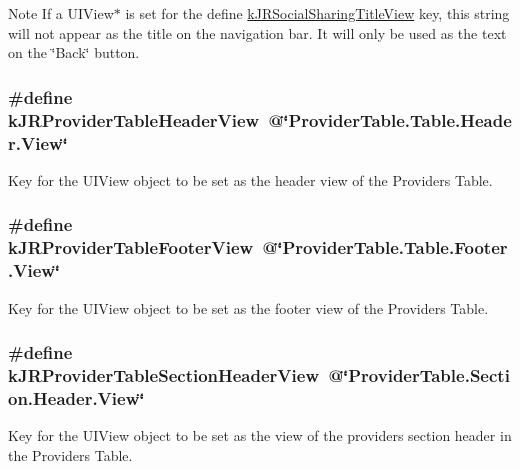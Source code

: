 \begin{DoxyNote}{Note}
If a {\ttfamily UIView$\ast$} is set for the define \hyperlink{group__custom_interface_ga524965cf426f0eb9de4bcb804528c7f7}{kJRSocialSharingTitleView} key, this string will not appear as the title on the navigation bar. It will only be used as the text on the \char`\"{}Back\char`\"{} button. 
\end{DoxyNote}
\hypertarget{group__custom_interface_ga1a0f39bfdb880fdd0b8b39cbec492b6f}{
\subsubsection[{kJRProviderTableHeaderView}]{\setlength{\rightskip}{0pt plus 5cm}\#define kJRProviderTableHeaderView~@\char`\"{}ProviderTable.Table.Header.View\char`\"{}}}
\label{group__custom_interface_ga1a0f39bfdb880fdd0b8b39cbec492b6f}
Key for the {\ttfamily UIView} object to be set as the header view of the Providers Table. \hypertarget{group__custom_interface_ga2b5c9162dd7701a552147ae1607a3b4d}{
\subsubsection[{kJRProviderTableFooterView}]{\setlength{\rightskip}{0pt plus 5cm}\#define kJRProviderTableFooterView~@\char`\"{}ProviderTable.Table.Footer.View\char`\"{}}}
\label{group__custom_interface_ga2b5c9162dd7701a552147ae1607a3b4d}
Key for the {\ttfamily UIView} object to be set as the footer view of the Providers Table. \hypertarget{group__custom_interface_gaaff8ebdd2b9badb1d0a019a71d47db46}{
\subsubsection[{kJRProviderTableSectionHeaderView}]{\setlength{\rightskip}{0pt plus 5cm}\#define kJRProviderTableSectionHeaderView~@\char`\"{}ProviderTable.Section.Header.View\char`\"{}}}
\label{group__custom_interface_gaaff8ebdd2b9badb1d0a019a71d47db46}
Key for the {\ttfamily UIView} object to be set as the view of the providers section header in the Providers Table.

